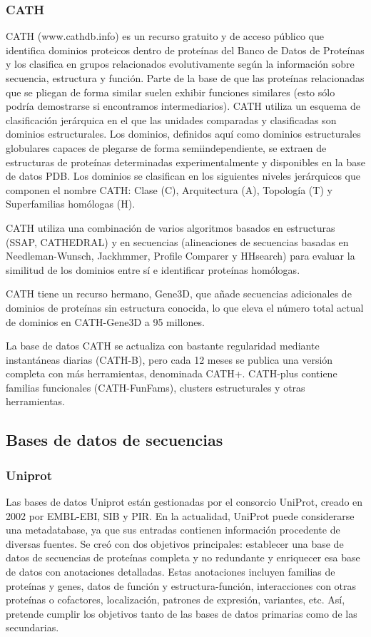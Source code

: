 \subsubsection{CATH}
CATH (www.cathdb.info) es un recurso gratuito y de acceso público que identifica dominios proteicos dentro de proteínas del Banco de Datos de Proteínas y los clasifica en grupos relacionados evolutivamente según la información sobre secuencia, estructura y función. Parte de la base de que las proteínas relacionadas que se pliegan de forma similar suelen exhibir funciones similares (esto sólo podría demostrarse si encontramos intermediarios). CATH utiliza un esquema de clasificación jerárquica en el que las unidades comparadas y clasificadas son dominios estructurales. Los dominios, definidos aquí como dominios estructurales globulares capaces de plegarse de forma semiindependiente, se extraen de estructuras de proteínas determinadas experimentalmente y disponibles en la base de datos PDB. Los dominios se clasifican en los siguientes niveles jerárquicos que componen el nombre CATH: Clase (C), Arquitectura (A), Topología (T) y Superfamilias homólogas (H).

CATH utiliza una combinación de varios algoritmos basados en estructuras (SSAP, CATHEDRAL) y en secuencias (alineaciones de secuencias basadas en Needleman-Wunsch, Jackhmmer, Profile Comparer y HHsearch) para evaluar la similitud de los dominios entre sí e identificar proteínas homólogas.

CATH tiene un recurso hermano, Gene3D, que añade secuencias adicionales de dominios de proteínas sin estructura conocida, lo que eleva el número total actual de dominios en CATH-Gene3D a 95 millones.

La base de datos CATH se actualiza con bastante regularidad mediante instantáneas diarias (CATH-B), pero cada 12 meses se publica una versión completa con más herramientas, denominada CATH+. CATH-plus contiene familias funcionales (CATH-FunFams), clusters estructurales y otras herramientas.

\subsection{Bases de datos de secuencias}
\subsubsection{Uniprot}
Las bases de datos Uniprot están gestionadas por el consorcio UniProt, creado en 2002 por EMBL-EBI, SIB y PIR. En la actualidad, UniProt puede considerarse una metadatabase, ya que sus entradas contienen información procedente de diversas fuentes. Se creó con dos objetivos principales: establecer una base de datos de secuencias de proteínas completa y no redundante y enriquecer esa base de datos con anotaciones detalladas. Estas anotaciones incluyen familias de proteínas y genes, datos de función y estructura-función, interacciones con otras proteínas o cofactores, localización, patrones de expresión, variantes, etc. Así, pretende cumplir los objetivos tanto de las bases de datos primarias como de las secundarias.

